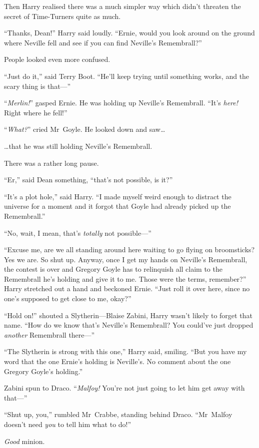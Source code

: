 Then Harry realised there was a much simpler way which didn’t threaten the secret of Time-Turners quite as much.

“Thanks, Dean!” Harry said loudly. “Ernie, would you look around on the ground where Neville fell and see if you can find Neville’s Remembrall?”

People looked even more confused.

“Just do it,” said Terry Boot. “He’ll keep trying until something works, and the scary thing is that—”

“\emph{Merlin!}” gasped Ernie. He was holding up Neville’s Remembrall. “It’s \emph{here!} Right where he fell!”

“\emph{What?}” cried Mr~Goyle. He looked down and saw…

…that he was still holding Neville’s Remembrall.

There was a rather long pause.

“Er,” said Dean something, “that’s not possible, is it?”

“It’s a plot hole,” said Harry. “I made myself weird enough to distract the universe for a moment and it forgot that Goyle had already picked up the Remembrall.”

“No, wait, I mean, that’s \emph{totally} not possible—”

“Excuse me, are we all standing around here waiting to go flying on broomsticks? Yes we are. So shut up. Anyway, once I get my hands on Neville’s Remembrall, the contest is over and Gregory Goyle has to relinquish all claim to the Remembrall he’s holding and give it to me. Those were the terms, remember?” Harry stretched out a hand and beckoned Ernie. “Just roll it over here, since no one’s supposed to get close to me, okay?”

“Hold on!” shouted a Slytherin—Blaise Zabini, Harry wasn’t likely to forget that name. “How do we know that’s Neville’s Remembrall? You could’ve just dropped \emph{another} Remembrall there—”

“The Slytherin is strong with this one,” Harry said, smiling. “But you have my word that the one Ernie’s holding is Neville’s. No comment about the one Gregory Goyle’s holding.”

Zabini spun to Draco. “\emph{Malfoy!} You’re not just going to let him get away with that—”

“Shut up, you,” rumbled Mr~Crabbe, standing behind Draco. “Mr~Malfoy doesn’t need \emph{you} to tell him what to do!”

\emph{Good} minion.

